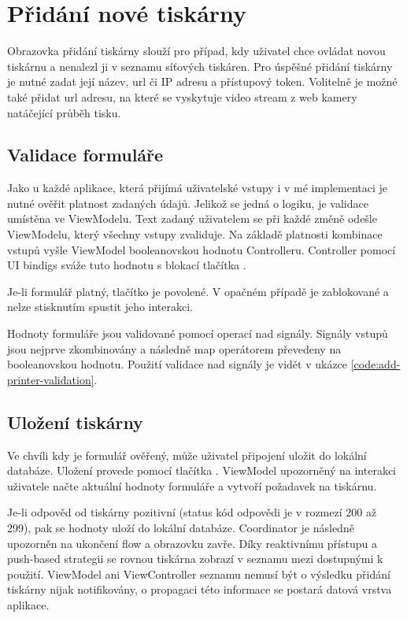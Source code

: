 \section{Přidání nové tiskárny}

Obrazovka přidání tiskárny slouží pro případ, kdy uživatel chce ovládat novou tiskárnu a nenalezl ji v seznamu síťových tiskáren.
Pro úspěšné přidání tiskárny je nutné zadat její název, \acrshort{url} či IP adresu a přístupový token.
Volitelně je možné také přidat url adresu, na které se vyskytuje video stream z web kamery natáčející průběh tisku.

\subsection{Validace formuláře}

Jako u každé aplikace, která přijímá uživatelské vstupy i v mé implementaci je nutné ověřit platnost zadaných údajů.
Jelikož se jedná o logiku, je validace umístěna ve ViewModelu.
Text zadaný uživatelem se při každé změně odešle ViewModelu, který všechny vstupy zvaliduje.
Na základě platnosti kombinace vstupů vyšle ViewModel booleanovskou hodnotu Controlleru.
Controller pomocí UI bindigs sváže tuto hodnotu s blokací tlačítka . 

Je-li formulář platný, tlačítko je povolené.
V opačném případě je zablokované a nelze stisknutím spustit jeho interakci.

Hodnoty formuláře jsou validované pomocí operací nad signály.
Signály vstupů jsou nejprve zkombinovány a následně map operátorem převedeny na booleanovskou hodnotu.
Použití validace nad signály je vidět v ukázce \ref{code:add-printer-validation}.


\subsection{Uložení tiskárny}

Ve chvíli kdy je formulář ověřený, může uživatel připojení uložit do lokální databáze.
Uložení provede pomocí tlačítka .
ViewModel upozorněný na interakci uživatele načte aktuální hodnoty formuláře a vytvoří požadavek na tiskárnu.

Je-li odpověd od tiskárny pozitivní (status kód odpovědi je v rozmezí 200 až 299), pak se hodnoty uloží do lokální databáze.
Coordinator je následně upozorněn na ukončení flow a obrazovku zavře.
Díky reaktivnímu přístupu a push-based strategii se rovnou tiskárna zobrazí v seznamu mezi dostupnými k použití.
ViewModel ani ViewController seznamu nemusí být o výsledku přidání tiskárny nijak notifikovány, o propagaci této informace se postará datová vrstva aplikace.

